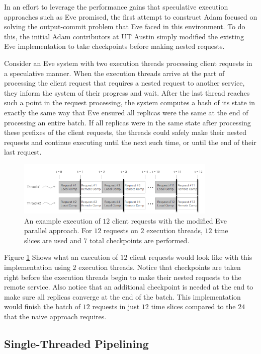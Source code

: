 \documentclass[11pt, oneside]{report}
\begin{document}
In an effort to leverage the performance gains that speculative execution approaches such as Eve promised, the first attempt to construct Adam focused on solving the output-commit problem that Eve faced in this environment. 
To do this, the initial Adam contributors at UT Austin simply modified the existing Eve implementation to take checkpoints before making nested requests. 

Consider an Eve system with two execution threads processing client requests in a speculative manner. 
When the execution threads arrive at the part of processing the client request that requires a nested request to another service, they inform the system of their progress and wait. 
After the last thread reaches such a point in the request processing, the system computes a hash of its state in exactly the same way that Eve ensured all replicas were the same at the end of processing an entire batch. 
If all replicas were in the same state after processing these prefixes of the client requests, the threads could safely make their nested requests and continue executing until the next such time, or until the end of their last request.

\begin{figure}[h]
\centering
\includegraphics[width=0.85\textwidth]{Parallel.png}
\caption{\label{parallel}An example execution of $12$ client requests with the modified Eve parallel approach. For $12$ requests on $2$ execution threads, $12$ time slices are used and $7$ total checkpoints are performed.}
\end{figure}

Figure \ref{parallel} Shows what an execution of $12$ client requests would look like with this implementation using $2$ execution threads. 
Notice that checkpoints are taken right before the execution threads begin to make their nested requests to the remote service. 
Also notice that an additional checkpoint is needed at the end to make sure all replicas converge at the end of the batch.
This implementation would finish the batch of $12$ requests in just $12$ time slices compared to the $24$ that the naive approach requires.

\subsection{Single-Threaded Pipelining}\label{STP}
\end{document}
